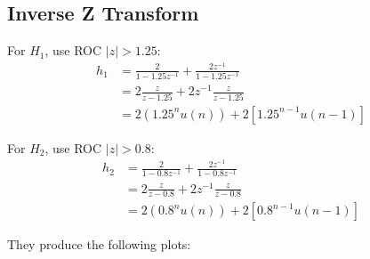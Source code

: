 \documentclass{article}
\begin{document}
\subsection{Inverse Z Transform}

For \(H_1\), use ROC \(|z| > 1.25\):
\begin{align*}
	h_1 & = \frac{2}{1-1.25 z^{-1}} + \frac{2 z^{-1}}{1-1.25 z^{-1}} \\
	    & =  2\frac{z}{z-1.25} + 2 z^{-1} \frac{z}{ z- 1.25}         \\
	    & = 2(1.25^n u(n)) + 2 \left[ 1.25^{n-1} u(n-1) \right]
\end{align*}


For \(H_2\), use ROC \(|z| > 0.8\):
\begin{align*}
	h_2 & = \frac{2}{1-0.8 z^{-1}} + \frac{2 z^{-1}}{1-0.8 z^{-1}} \\
	    & =  2\frac{z}{z-0.8} + 2 z^{-1} \frac{z}{ z- 0.8}         \\
	    & = 2(0.8^n u(n)) + 2 \left[ 0.8^{n-1} u(n-1) \right]
\end{align*}

They produce the following plots:
\end{document}

